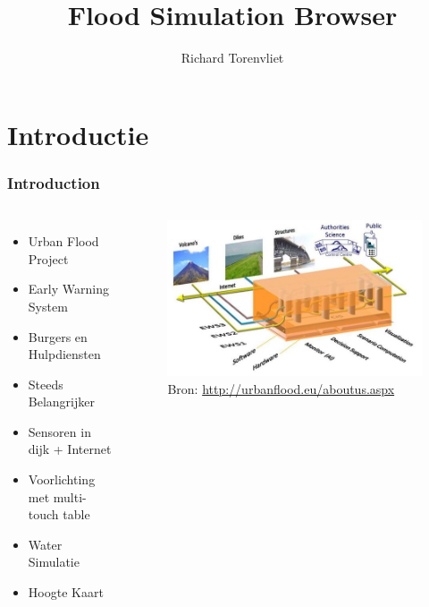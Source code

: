 \documentclass[10pt,a4paper]{beamer}
\author{Richard Torenvliet}
\title{Flood Simulation Browser}
\begin{document}
\begin{frame}
\maketitle
\end{frame}
\begin{frame}
\tableofcontents
\end{frame}
\section{Introductie}
\begin{frame}
\frametitle{Introduction}
\begin{columns}[c]
\column{1.5in}
\begin{itemize}
\item Urban Flood Project
\item Early Warning System
\item Burgers en Hulpdiensten
\item Steeds Belangrijker
\item Sensoren in dijk + Internet
\item Voorlichting met multi-touch table
\item Water Simulatie
\item Hoogte Kaart
\end{itemize}
\column{2.0in}
\begin{figure}
\includegraphics[scale=0.3]{concept.png}
\caption{Bron: \url{http://urbanflood.eu/aboutus.aspx}}
\end{figure}
\end{columns}
\end{frame}
\end{document}

